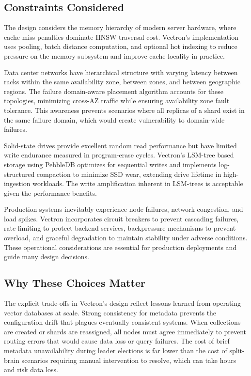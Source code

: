 \documentclass[conference]{IEEEtran}
\begin{document}
\subsection{Constraints Considered}

The design considers the memory hierarchy of modern server hardware, where cache miss penalties dominate HNSW traversal cost. Vectron's implementation uses pooling, batch distance computation, and optional hot indexing to reduce pressure on the memory subsystem and improve cache locality in practice.

Data center networks have hierarchical structure with varying latency between racks within the same availability zone, between zones, and between geographic regions. The failure domain-aware placement algorithm accounts for these topologies, minimizing cross-AZ traffic while ensuring availability zone fault tolerance. This awareness prevents scenarios where all replicas of a shard exist in the same failure domain, which would create vulnerability to domain-wide failures.

Solid-state drives provide excellent random read performance but have limited write endurance measured in program-erase cycles. Vectron's LSM-tree based storage using PebbleDB \cite{pebble} optimizes for sequential writes and implements log-structured compaction to minimize SSD wear, extending drive lifetime in high-ingestion workloads. The write amplification inherent in LSM-trees \cite{lsm} is acceptable given the performance benefits.

Production systems inevitably experience node failures, network congestion, and load spikes. Vectron incorporates circuit breakers to prevent cascading failures, rate limiting to protect backend services, backpressure mechanisms to prevent overload, and graceful degradation to maintain stability under adverse conditions. These operational considerations are essential for production deployments and guide many design decisions.

\subsection{Why These Choices Matter}

The explicit trade-offs in Vectron's design reflect lessons learned from operating vector databases at scale. Strong consistency for metadata prevents the configuration drift that plagues eventually consistent systems. When collections are created or shards are reassigned, all nodes must agree immediately to prevent routing errors that would cause data loss or query failures. The cost of brief metadata unavailability during leader elections is far lower than the cost of split-brain scenarios requiring manual intervention to resolve, which can take hours and risk data loss.
\end{document}
